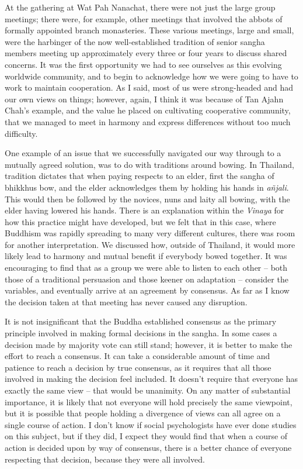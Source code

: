 At the gathering at Wat Pah Nanachat, there were not just the large
group meetings; there were, for example, other meetings that involved
the abbots of formally appointed branch monasteries. These various
meetings, large and small, were the harbinger of the now
well-established tradition of senior sangha members meeting up
approximately every three or four years to discuss shared concerns. It
was the first opportunity we had to see ourselves as this evolving
worldwide community, and to begin to acknowledge how we were going to
have to work to maintain cooperation. As I said, most of us were
strong-headed and had our own views on things; however, again, I think
it was because of Tan Ajahn Chah's example, and the value he placed on
cultivating cooperative community, that we managed to meet in harmony
and express differences without too much difficulty.

One example of an issue that we successfully navigated our way through
to a mutually agreed solution, was to do with traditions around bowing.
In Thailand, tradition dictates that when paying respects to an elder,
first the sangha of bhikkhus bow, and the elder acknowledges them by
holding his hands in \emph{añjali}. This would then be followed by the
novices, nuns and laity all bowing, with the elder having lowered his
hands. There is an explanation within the \emph{Vinaya} for how this
practice might have developed, but we felt that in this case, where
Buddhism was rapidly spreading to many very different cultures, there
was room for another interpretation. We discussed how, outside of
Thailand, it would more likely lead to harmony and mutual benefit if
everybody bowed together. It was encouraging to find that as a group we
were able to listen to each other -- both those of a traditional
persuasion and those keener on adaptation -- consider the variables, and
eventually arrive at an agreement by consensus. As far as I know the
decision taken at that meeting has never caused any disruption.

It is not insignificant that the Buddha established consensus as the
primary principle involved in making formal decisions in the sangha. In
some cases a decision made by majority vote can still stand; however, it
is better to make the effort to reach a consensus. It can take a
considerable amount of time and patience to reach a decision by true
consensus, as it requires that all those involved in making the decision
feel included. It doesn't require that everyone has exactly the same
view -- that would be unanimity. On any matter of substantial importance, it is likely that not everyone will hold precisely the same viewpoint, but it is possible that people holding a divergence of views can all agree on a single course of action. I don't know if social
psychologists have ever done studies on this subject, but if they did, I
expect they would find that when a course of action is decided upon by
way of consensus, there is a better chance of everyone respecting that
decision, because they were all involved.

